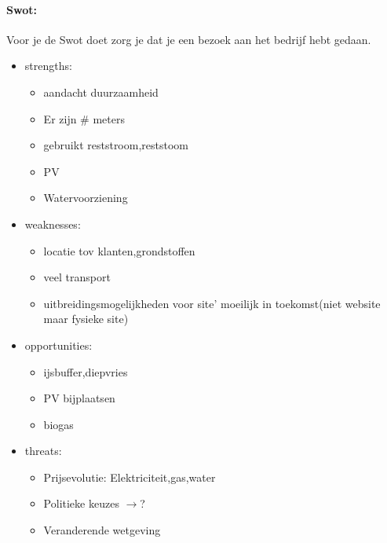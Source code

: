 \documentclass[12pt]{article}
\begin{document}
\paragraph{Swot:}
Voor je de Swot doet zorg je dat je een bezoek aan het bedrijf hebt gedaan.
\begin{itemize}
    \item strengths:\begin{itemize}
        \item aandacht duurzaamheid 
        \item Er zijn \# meters 
        \item gebruikt reststroom,reststoom 
        \item PV 
        \item Watervoorziening
    \end{itemize}
    \item weaknesses:\begin{itemize}
        \item locatie tov klanten,grondstoffen
        \item veel transport
        \item uitbreidingsmogelijkheden voor site' moeilijk in toekomst(niet website maar fysieke site)
    \end{itemize}
    \item opportunities:\begin{itemize}
        \item ijsbuffer,diepvries
        \item PV bijplaatsen
        \item biogas
    \end{itemize}
    \item threats:\begin{itemize}
        \item Prijsevolutie: Elektriciteit,gas,water
        \item Politieke keuzes $\rightarrow$?
        \item Veranderende wetgeving
    \end{itemize}
\end{itemize}
\end{document}
